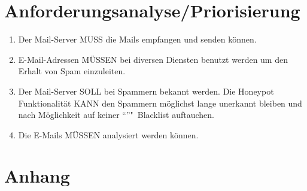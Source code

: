 \documentclass[a4paper,11pt,singlespacing]{article}
\begin{document}
\section{Anforderungsanalyse/Priorisierung}\label{sec:AnforderungsanalysePriorisierung}
	\begin{enumerate}
	\item Der Mail-Server MUSS die Mails empfangen und senden können. %
	\item E-Mail-Adressen MÜSSEN bei diversen Diensten benutzt werden um den Erhalt von Spam einzuleiten. %
	\item Der Mail-Server SOLL bei Spammern bekannt werden. Die Honeypot Funktionalität KANN den Spammern möglichst lange unerkannt bleiben und nach Möglichkeit auf keiner "`"'"~Blacklist auftauchen. %
	\item Die E-Mails MÜSSEN analysiert werden können.
	\end{enumerate}


%
%
%
%
%
%


\newpage




\listoffigures
{}

\lstlistoflistings
{}

\newpage

\section*{Anhang}\label{Anhang}

%
\end{document}

